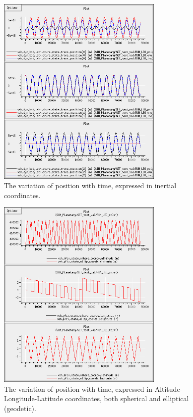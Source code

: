\begin{description}
\begin{enumerate}
\begin{figure}[!ht]
  \begin{center}
        \includegraphics[width=80mm]{figures/planetary_leo_polar_inrtl.jpg}
        \caption{The variation of position with time, expressed in inertial coordinates.} 
        \label{fig:planetaryleopolarinrtl}
  \end{center}
\end{figure}

\begin{figure}[!ht]
  \begin{center}
        \includegraphics[width=80mm]{figures/planetary_leo_polar_lal.jpg}
        \caption{The variation of position with time, expressed in Altitude-Longitude-Latitude coordinates, both spherical and elliptical (geodetic).} 
        \label{fig:planetaryleopolarlal}
  \end{center}
\end{figure}


\end{enumerate}
\end{description}
